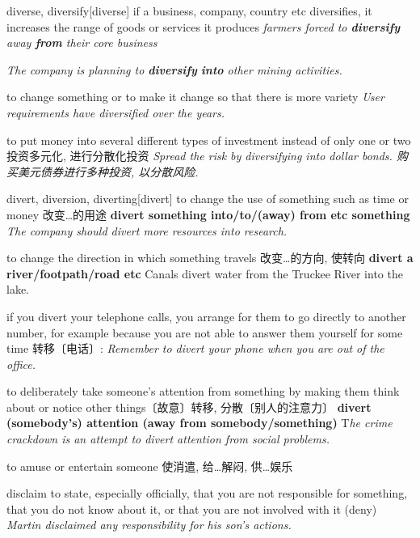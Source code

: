 \begin{DefWord}{diverse, diversify}[diverse]
    if a business, company, country etc diversifies, it increases the range of goods or services it produces
    \textit{farmers forced to \textbf{diversify} away \textbf{from} their core business}

    \textit{The company is planning to \textbf{diversify} \textbf{into} other mining activities.}

    to change something or to make it change so that there is more variety
    \textit{User requirements have diversified over the years.}

    to put money into several different types of investment instead of only one or two 投资多元化, 进行分散化投资
    \textit{Spread the risk by diversifying into dollar bonds. 购买美元债券进行多种投资, 以分散风险. }

\end{DefWord}

\begin{DefWord}{divert, diversion, diverting}[divert]
    to change the use of something such as time or money 改变…的用途
    \textbf{divert something into/to/(away) from etc something}
    \textit{The company should divert more resources into research.}

    to change the direction in which something travels 改变…的方向, 使转向
    \textbf{divert a river/footpath/road etc}
    Canals divert water from the Truckee River into the lake.

    if you divert your telephone calls, you arrange for them to go directly to another number, for example because you are not able to answer them yourself for some time 转移〔电话〕:
    \textit{Remember to divert your phone when you are out of the office.}

    to deliberately take someone's attention from something by making them think about or notice other things〔故意〕转移, 分散〔别人的注意力〕
    \textbf{divert (somebody's) attention (away from somebody/something)}
    T\textit{he crime crackdown is an attempt to divert attention from social problems.}
 
    to amuse or entertain someone 使消遣, 给…解闷, 供…娱乐

\end{DefWord}


\begin{DefWord}{disclaim}
    to state, especially officially, that you are not responsible for something, that you do not know about it, or that you are not involved with it (deny)
    \textit{Martin disclaimed any responsibility for his son's actions.}
\end{DefWord}